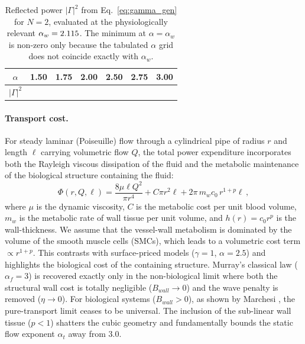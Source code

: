 \documentclass[11pt,a4paper]{article}
\theoremstyle{remark}
\begin{document}
\begin{table}[H]
\centering
\caption{Reflected power $|\Gamma|^2$ from Eq.~\eqref{eq:gamma_gen} for $N=2$, evaluated at the physiologically relevant $\alpha_w = 2.115$. The minimum at $\alpha = \alpha_w$ is non-zero only because the tabulated $\alpha$ grid does not coincide exactly with $\alpha_w$.}
\label{tab:gamma}
\small
\begin{tabular}{@{}ccccccc@{}}
\toprule
$\alpha$ & 1.50 & 1.75 & 2.00 & 2.50 & 2.75 & 3.00 \\
\midrule
$|\Gamma|^2$ & \VarGammaAWOneFive{} & \VarGammaAWOneSevenFive{} & \VarGammaAWTwoZero{} & \VarGammaAWTwoFive{} & \VarGammaAWTwoSevenFive{} & \VarGammaAWThreeZero{} \\
\bottomrule
\end{tabular}
\end{table}

\paragraph{Transport cost.}
For steady laminar (Poiseuille) flow through a cylindrical pipe of radius $r$
and length $\ell$ carrying volumetric flow $Q$, the total power expenditure
incorporates both the Rayleigh viscous dissipation of the fluid and the
metabolic maintenance of the biological structure containing the fluid:
\begin{equation}
  \Phi(r, Q, \ell) = \frac{8\mu \ell Q^2}{\pi r^4} + C\pi r^2 \ell + 2\pi\,m_w c_0\, r^{1+p} \ell\,,
  \label{eq:rayleigh}
\end{equation}
where $\mu$ is the dynamic viscosity, $C$ is the metabolic cost per unit blood
volume, $m_w$ is the metabolic rate of wall tissue per unit volume, and $h(r) =
c_0 r^p$ is the wall-thickness. We assume that the vessel-wall metabolism is
dominated by the volume of the smooth muscle cells (SMCs), which leads to a
volumetric cost term $\propto r^{1+p}$. This contrasts with surface-priced
models ($\gamma=1$, $\alpha=2.5$) and highlights the biological cost of the
containing structure.
Murray's classical law ($\alpha_f = 3$) is recovered exactly only in the
non-biological limit where both the structural wall cost is totally negligible
($B_{wall} \to 0$) and the wave penalty is removed ($\eta \to 0$). For
biological systems ($B_{wall} > 0$), as shown by Marchesi
\cite{Marchesi2026static}, the pure-transport limit ceases to be universal. The
inclusion of the sub-linear wall tissue ($p<1$) shatters the cubic geometry and
fundamentally bounds the static flow exponent $\alpha_t$ away from 3.0.
\end{document}
